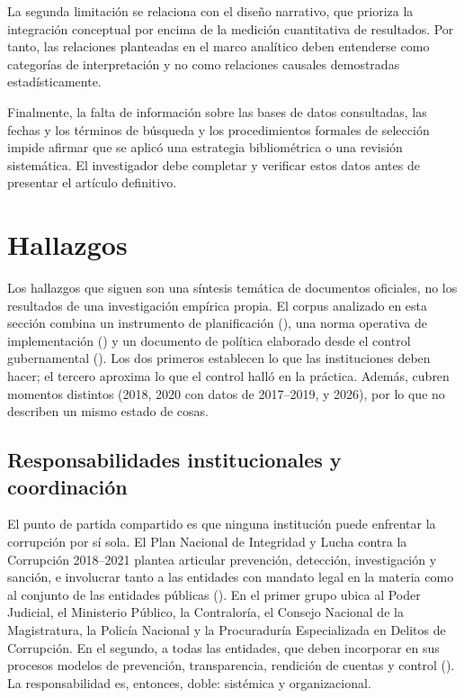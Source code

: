 \documentclass[Afour,sageh,times]{sagej}
\begin{document}
La segunda limitación se relaciona con el diseño narrativo, que prioriza la integración conceptual por encima de la medición cuantitativa de resultados. Por tanto, las relaciones planteadas en el marco analítico deben entenderse como categorías de interpretación y no como relaciones causales demostradas estadísticamente.

Finalmente, la falta de información sobre las bases de datos consultadas, las fechas y los términos de búsqueda y los procedimientos formales de selección impide afirmar que se aplicó una estrategia bibliométrica o una revisión sistemática. El investigador debe completar y verificar estos datos antes de presentar el artículo definitivo.

\section{Hallazgos}
\label{sec:hallazgos}

Los hallazgos que siguen son una síntesis temática de documentos oficiales, no los resultados de una investigación empírica propia. El corpus analizado en esta sección combina un instrumento de planificación (\citealp{pcm2018plan}), una norma operativa de implementación (\citealp{pcm2026directiva}) y un documento de política elaborado desde el control gubernamental (\citealp{contraloria2020corrupcion}). Los dos primeros establecen lo que las instituciones deben hacer; el tercero aproxima lo que el control halló en la práctica. Además, cubren momentos distintos (2018, 2020 con datos de 2017–2019, y 2026), por lo que no describen un mismo estado de cosas.

\subsection{Responsabilidades institucionales y coordinación}
\label{subsec:responsabilidades}

El punto de partida compartido es que ninguna institución puede enfrentar la corrupción por sí sola. El Plan Nacional de Integridad y Lucha contra la Corrupción 2018–2021 plantea articular prevención, detección, investigación y sanción, e involucrar tanto a las entidades con mandato legal en la materia como al conjunto de las entidades públicas (\citealp{pcm2018plan}). En el primer grupo ubica al Poder Judicial, el Ministerio Público, la Contraloría, el Consejo Nacional de la Magistratura, la Policía Nacional y la Procuraduría Especializada en Delitos de Corrupción. En el segundo, a todas las entidades, que deben incorporar en sus procesos modelos de prevención, transparencia, rendición de cuentas y control (\citealp{pcm2018plan}). La responsabilidad es, entonces, doble: sistémica y organizacional.
\end{document}
